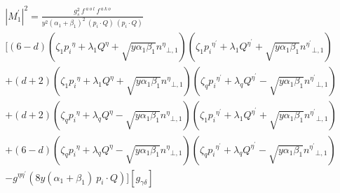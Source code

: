 \begin{equation}
\begin{split}
{|{M}^{\prime}_1|}^2 =\frac{g_s^2 \:f^{\:a\:o\:l}\: f^{\:a\:k\:o}}{y^2({\alpha_1}+\beta_1)^2\:(p_i\cdot Q) \:(p_i\cdot Q)} \\
[(6-d)(\zeta_1 {p_i}^{\eta} + \lambda_1{Q}^{\eta} + \sqrt{y\alpha_1\beta_1}{n^{\eta}}_{\bot,1})(\zeta_1 {p_i}^{{\eta}^{\prime}} + \lambda_1{Q}^{{\eta}^{\prime}} + \sqrt{y\alpha_1\beta_1}{n^{{\eta}^{\prime}}}_{\bot,1})\\
+(d+2)(\zeta_1 {p_i}^{\eta} + \lambda_1{Q}^{\eta} + \sqrt{y\alpha_1\beta_1}{n^{\eta}}_{\bot,1})(\zeta_q {p_i}^{{\eta}^{\prime}} + \lambda_q{Q}^{{\eta}^{\prime}} - \sqrt{y\alpha_1\beta_1}{n^{{\eta}^{\prime}}}_{\bot,1})\\
+(d+2)(\zeta_q {p_i}^{\eta} + \lambda_q{Q}^{\eta} - \sqrt{y\alpha_1\beta_1}{n^{\eta}}_{\bot,1})(\zeta_1 {p_i}^{{\eta}^{\prime}} + \lambda_1{Q}^{{\eta}^{\prime}} + \sqrt{y\alpha_1\beta_1}{n^{{\eta}^{\prime}}}_{\bot,1})\\
+(6-d)(\zeta_q {p_i}^{\eta} + \lambda_q{Q}^{\eta} - \sqrt{y\alpha_1\beta_1}{n^{\eta}}_{\bot,1})(\zeta_q {p_i}^{{\eta}^{\prime}} + \lambda_q{Q}^{{\eta}^{\prime}} - \sqrt{y\alpha_1\beta_1}{n^{{\eta}^{\prime}}}_{\bot,1})\\
-g^{{\eta}{{\eta}^{\prime}}}(8y({\alpha_1}+\beta_1)\:p_i\cdot Q )][g_{{\gamma}{\delta}}]\\
\\
\end{split}
\end{equation}

